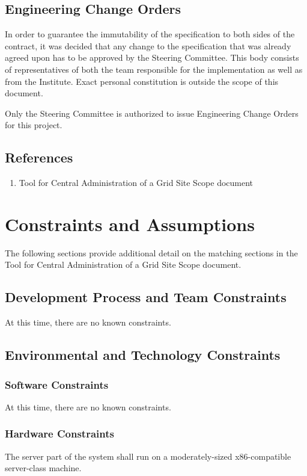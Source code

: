 \documentclass[12pt]{article}
\begin{document}
\subsection{Engineering Change Orders}
\label{steering-committee}

In order to guarantee the immutability of the specification to both sides of the
contract, it was decided that any change to the specification that was already
agreed upon has to be approved by the Steering Committee.  This body consists of
representatives of both the team responsible for the implementation as well as
from the Institute.  Exact personal constitution is outside the scope of this
document.

Only the Steering Committee is authorized to issue Engineering Change Orders for
this project.

\subsection{References}

\begin{enumerate}
	\item Tool for Central Administration of a Grid Site Scope document
\end{enumerate}


\section{Constraints and Assumptions}
The following sections provide additional detail on the matching sections in the Tool for Central Administration of a Grid Site 
Scope document.

\subsection{Development Process and Team Constraints}
At this time, there are no known constraints.

\subsection{Environmental and Technology Constraints}

\subsubsection{Software Constraints}
At this time, there are no known constraints.

\subsubsection{Hardware Constraints}
The server part of the system shall run on a moderately-sized x86-compatible
server-class machine.
\end{document}
